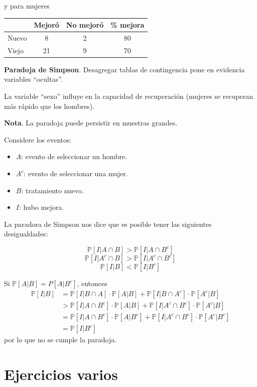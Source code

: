 \documentclass[
  12pt,
]{book}
\begin{document}
y para mujeres

\begin{longtable}[]{@{}lccc@{}}
\toprule
& Mejoró & No mejoró & \% mejora\tabularnewline
\midrule
\endhead
Nuevo & 8 & 2 & 80\tabularnewline
Viejo & 21 & 9 & 70\tabularnewline
\bottomrule
\end{longtable}

\textbf{Paradoja de Simpson}. Desagregar tablas de contingencia pone en evidencia variables ``ocultas''.

La variable ``sexo'' influye en la capacidad de recuperación (mujeres se recuperan más rápido que los hombres).

\textbf{Nota}. La paradoja puede persistir en muestras grandes.

Considere los eventos:

\begin{itemize}
\item
  \(A\): evento de seleccionar un hombre.
\item
  \(A^c\): evento de seleccionar una mujer.
\item
  \(B\): tratamiento nuevo.
\item
  \(I\): hubo mejora.
\end{itemize}

La paradora de Simpson nos dice que es posible tener las siguientes desigualdades:

\[\mathbb P[I|A\cap B]>\mathbb P[I|A\cap B^c]\]
\[\mathbb P[I|A^c\cap B]>\mathbb P[I|A ^c\cap B^c]\]
\[\mathbb P[I|B]<\mathbb P[I|B^c]\]

Si \(\mathbb P[A|B] = P[A|B^c]\), entonces
\begin{align*}
\mathbb P[I|B] & = \mathbb P[I|B\cap A] \cdot \mathbb P[A|B]  + \mathbb P[I|B\cap A^c] \cdot \mathbb P[A^c|B] \\& > \mathbb P[I|A\cap B^c] \cdot \mathbb P[A|B]  + \mathbb P[I|A^c\cap B^c] \cdot \mathbb P[A^c|B]\\
& =  \mathbb P[I|A\cap B^c] \cdot \mathbb P[A|B^c]  + \mathbb P[I|A^c\cap B^c] \cdot \mathbb P[A^c|B^c] \\
& = \mathbb P[I|B^c]
\end{align*}
por lo que no se cumple la paradoja.

\hypertarget{ejercicios-varios}{%
\chapter{Ejercicios varios}\label{ejercicios-varios}}
\end{document}
